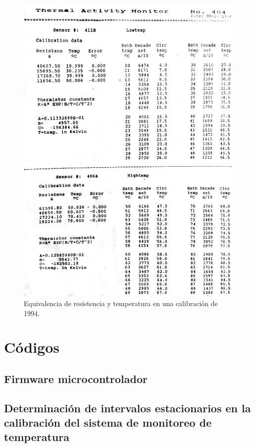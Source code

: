 	\begin{figure}[!h]
		\centering
		\includegraphics[height =0.95\textheight]{Figures/temperatureTable}
		\caption{Equivalencia de resistencia y temperatura en una calibraci\'on de 1994.}
		\label{fig: temperatureTable}
	\end{figure}

\chapter{Códigos}\label{anx: codigos}
	\section{Firmware microcontrolador}
		
		
	\section{Determinación de intervalos estacionarios en la calibración del sistema de monitoreo de temperatura}
		
		
